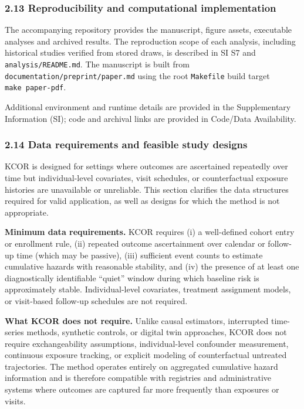 \documentclass[
]{article}
\begin{document}
\subsubsection{2.13 Reproducibility and computational implementation}\label{reproducibility-and-computational-implementation}

The accompanying repository provides the manuscript, figure assets, executable analyses and archived results. The reproduction scope of each analysis, including historical studies verified from stored draws, is described in SI S7 and \texttt{analysis/README.md}. The manuscript is built from \texttt{documentation/preprint/paper.md} using the root \texttt{Makefile} build target \texttt{make\ paper-pdf}.

Additional environment and runtime details are provided in the Supplementary Information (SI); code and archival links are provided in Code/Data Availability.

\subsubsection{2.14 Data requirements and feasible study designs}\label{data-requirements-and-feasible-study-designs}

KCOR is designed for settings where outcomes are ascertained repeatedly over time but individual-level covariates, visit schedules, or counterfactual exposure histories are unavailable or unreliable. This section clarifies the data structures required for valid application, as well as designs for which the method is not appropriate.

\textbf{Minimum data requirements.} KCOR requires (i) a well-defined cohort entry or enrollment rule, (ii) repeated outcome ascertainment over calendar or follow-up time (which may be passive), (iii) sufficient event counts to estimate cumulative hazards with reasonable stability, and (iv) the presence of at least one diagnostically identifiable ``quiet'' window during which baseline risk is approximately stable. Individual-level covariates, treatment assignment models, or visit-based follow-up schedules are not required.

\textbf{What KCOR does not require.} Unlike causal estimators, interrupted time-series methods, synthetic controls, or digital twin approaches, KCOR does not require exchangeability assumptions, individual-level confounder measurement, continuous exposure tracking, or explicit modeling of counterfactual untreated trajectories. The method operates entirely on aggregated cumulative hazard information and is therefore compatible with registries and administrative systems where outcomes are captured far more frequently than exposures or visits.
\end{document}
